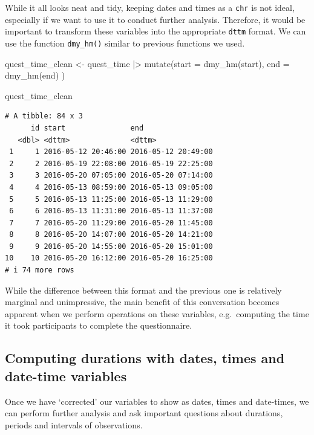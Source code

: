 \documentclass[
  letterpaper,
]{krantz}
\makeatletter
\newenvironment{Shaded}{\begin{snugshade}}{\end{snugshade}}
\newcommand{\AttributeTok}[1]{\textcolor[rgb]{0.40,0.45,0.13}{#1}}
\newcommand{\FunctionTok}[1]{\textcolor[rgb]{0.28,0.35,0.67}{#1}}
\newcommand{\NormalTok}[1]{\textcolor[rgb]{0.00,0.23,0.31}{#1}}
\newcommand{\OtherTok}[1]{\textcolor[rgb]{0.00,0.23,0.31}{#1}}
\newcommand{\SpecialCharTok}[1]{\textcolor[rgb]{0.37,0.37,0.37}{#1}}
\newenvironment{kframe}{%
\medskip{}
\setlength{\fboxsep}{.8em}
 \def\at@end@of@kframe{}%
 \ifinner\ifhmode%
  \def\at@end@of@kframe{\end{minipage}}%
  \begin{minipage}{\columnwidth}%
 \fi\fi%
 \def\FrameCommand##1{\hskip\@totalleftmargin \hskip-\fboxsep
 \colorbox{shadecolor}{##1}\hskip-\fboxsep
     \hskip-\linewidth \hskip-\@totalleftmargin \hskip\columnwidth}%
 \MakeFramed {\advance\hsize-\width
   \@totalleftmargin\z@ \linewidth\hsize
   \@setminipage}}%
 {\par\unskip\endMakeFramed%
 \at@end@of@kframe}
\renewenvironment{Shaded}{\begin{kframe}}{\end{kframe}}
\makeatother
\begin{document}
While it all looks neat and tidy, keeping dates and times as a
\texttt{chr} is not ideal, especially if we want to use it to conduct
further analysis. Therefore, it would be important to transform these
variables into the appropriate \texttt{dttm} format. We can use the
function \texttt{dmy\_hm()} similar to previous functions we used.

\begin{Shaded}
\begin{Highlighting}[]
\NormalTok{quest\_time\_clean }\OtherTok{\textless{}{-}}
\NormalTok{  quest\_time }\SpecialCharTok{|\textgreater{}}
  \FunctionTok{mutate}\NormalTok{(}\AttributeTok{start =} \FunctionTok{dmy\_hm}\NormalTok{(start),}
         \AttributeTok{end =} \FunctionTok{dmy\_hm}\NormalTok{(end)}
\NormalTok{         )}

\NormalTok{quest\_time\_clean}
\end{Highlighting}
\end{Shaded}

\begin{verbatim}
# A tibble: 84 x 3
      id start               end                
   <dbl> <dttm>              <dttm>             
 1     1 2016-05-12 20:46:00 2016-05-12 20:49:00
 2     2 2016-05-19 22:08:00 2016-05-19 22:25:00
 3     3 2016-05-20 07:05:00 2016-05-20 07:14:00
 4     4 2016-05-13 08:59:00 2016-05-13 09:05:00
 5     5 2016-05-13 11:25:00 2016-05-13 11:29:00
 6     6 2016-05-13 11:31:00 2016-05-13 11:37:00
 7     7 2016-05-20 11:29:00 2016-05-20 11:45:00
 8     8 2016-05-20 14:07:00 2016-05-20 14:21:00
 9     9 2016-05-20 14:55:00 2016-05-20 15:01:00
10    10 2016-05-20 16:12:00 2016-05-20 16:25:00
# i 74 more rows
\end{verbatim}

While the difference between this format and the previous one is
relatively marginal and unimpressive, the main benefit of this
conversation becomes apparent when we perform operations on these
variables, e.g.~computing the time it took participants to complete the
questionnaire.

\subsection{Computing durations with dates, times and date-time
variables}\label{sec-computation-dates-times}

Once we have `corrected' our variables to show as dates, times and
date-times, we can perform further analysis and ask important questions
about durations, periods and intervals of observations.
\end{document}
